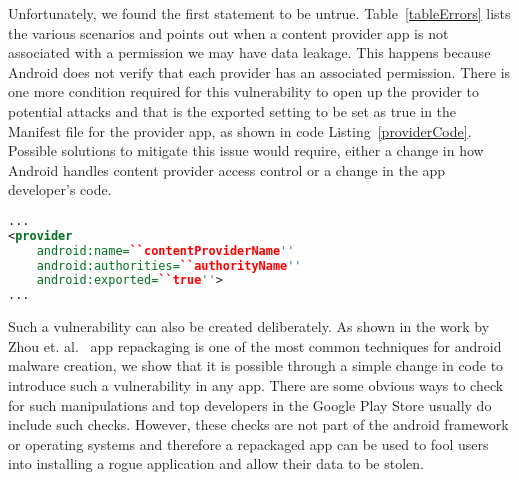 Unfortunately, we found the first statement to be untrue. Table~\ref{tableErrors} lists the various scenarios and points out when a content provider app is not associated with a permission we may have data leakage. This happens because Android does not verify that each provider has an associated permission. There is one more condition required for this vulnerability to open up the provider to potential attacks and that is the exported setting to be set as true in the Manifest file for the provider app, as shown in code Listing~\ref{providerCode}. Possible solutions to mitigate this issue would require, either a change in how Android handles content provider access control or a change in the app developer's code.

\begin{lstlisting}[caption={Provider exported tag set as true},label={providerCode},language=XML]
...
<provider
	android:name=``contentProviderName''
	android:authorities=``authorityName''
	android:exported=``true''>
...
\end{lstlisting}

Such a vulnerability can also be created deliberately. As shown in the work by Zhou et. al.~\cite{Zhou2012MalwareGenomeProject} app repackaging is one of the most common techniques for android malware creation, we show that it is possible through a simple change in code to introduce such a vulnerability in any app. There are some obvious ways to check for such manipulations and top developers in the Google Play Store usually do include such checks. However, these checks are not part of the android framework or operating systems and therefore a repackaged app can be used to fool users into installing a rogue application and allow their data to be stolen.